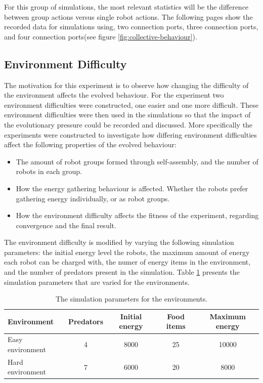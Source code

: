 For this group of simulations, the most relevant statistics will be the difference between group actions versus single robot actions.
The following pages show the recorded data for simulations using, two connection ports, three connection ports, and four connection ports(see figure \ref{fig:collective-behaviour}).


\newpage

\pagestyle{plain}



\newpage

\pagestyle{main}

\subsection{Environment Difficulty}
The motivation for this experiment is to observe how changing the difficulty of the environment affects the evolved behaviour.
For the experiment two environment difficulties were constructed, one easier and one more difficult.
These environment difficulties were then used in the simulations so that the impact of the evolutionary pressure could be recorded and discussed.
More specifically the experiments were constructed to investigate how differing environment difficulties affect the following properties of the evolved behaviour:

\begin{itemize}
	\item The amount of robot groups formed through self-assembly, and the number of robots in each group.
	\item How the energy gathering behaviour is affected. Whether the robots prefer gathering energy individually, or as robot groups. 
	\item How the environment difficulty affects the fitness of the experiment, regarding convergence and the final result.
\end{itemize}


The environment difficulty is modified by varying the following simulation parameters:
the initial energy level the robots, the maximum amount of energy each robot can be charged with, the numer of energy items in the environment, and the number of predators present in the simulation.
Table \ref{tab:environment-difficulty} presents the simulation parameters that are varied for the environments.

\begin{table}[H]
	\centering
	
	\begin{tabular}{@{} l c c c c @{}}
		\toprule 
		Environment & \small{Predators} & \small{Initial energy} & \small{Food items} & \small{Maximum energy} \\ 
		\midrule 
		\small{Easy environment} & 4 & 8000 & 25 & 10000 \\ 
		\small{Hard environment} & 7 & 6000 & 20 &8000 \\ 
		\bottomrule 
		
	\end{tabular} 
	\caption{The simulation parameters for the environments.}
	\label{tab:environment-difficulty}
\end{table}

